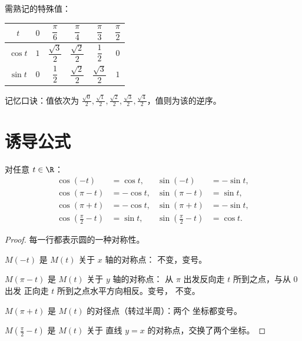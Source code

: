 需熟记的特殊值：
\begin{center}
\begin{tabular}{c|ccccc}
$t$ & $0$ & $\dfrac{\pi}{6}$ & $\dfrac{\pi}{4}$ & $\dfrac{\pi}{3}$ & $\dfrac{\pi}{2}$\\[6pt]
\hline\rule{0pt}{14pt}%
$\cos t$ & $1$ & $\dfrac{\sqrt3}{2}$ & $\dfrac{\sqrt2}{2}$ & $\dfrac12$ & $0$\\[6pt]
$\sin t$ & $0$ & $\dfrac12$ & $\dfrac{\sqrt2}{2}$ & $\dfrac{\sqrt3}{2}$ & $1$
\end{tabular}
\end{center}

\begin{remark}
记忆口诀：值依次为
$\frac{\sqrt0}{2}, \frac{\sqrt1}{2}, \frac{\sqrt2}{2}, \frac{\sqrt3}{2},
\frac{\sqrt4}{2}$，值则为该的逆序。
\end{remark}

\section{诱导公式}

\begin{proposition}[诱导公式]\label{prop:g11:trigo:associated}
对任意 $t \in \R$：
\[
\begin{aligned}
\cos(-t) &= \cos t, & \sin(-t) &= -\sin t,\\
\cos(\pi - t) &= -\cos t, & \sin(\pi - t) &= \sin t,\\
\cos(\pi + t) &= -\cos t, & \sin(\pi + t) &= -\sin t,\\
\cos\left(\tfrac{\pi}{2} - t\right) &= \sin t, &
\sin\left(\tfrac{\pi}{2} - t\right) &= \cos t .
\end{aligned}
\]
\end{proposition}

\begin{proof}
每一行都表示圆的一种对称性。

$M(-t)$ 是 $M(t)$ 关于 $x$ 轴的对称点：
不变，变号。

$M(\pi - t)$ 是 $M(t)$ 关于 $y$ 轴的对称点：
从 $\pi$ 出发反向走 $t$ 所到之点，与从 $0$ 出发
正向走 $t$ 所到之点水平方向相反。变号，
不变。

$M(\pi + t)$ 是 $M(t)$ 的对径点（转过半周）：两个
坐标都变号。

$M\!\left(\frac\pi2 - t\right)$ 是 $M(t)$ 关于
直线 $y = x$ 的对称点，交换了两个坐标。
\end{proof}

